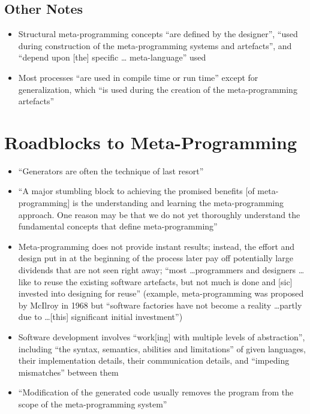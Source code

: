 \subsection{Other Notes}
\begin{itemize}
      \item Structural meta-programming concepts ``are defined by the
            designer'', ``used during construction of the meta-programming
            systems and artefacts'', and ``depend upon [the] specific \dots
            meta-language'' used \citep[p.~24]{stuikys_taxonomy_2013}
      \item Most processes ``are used in compile time or run time'' except for
            generalization, which ``is used during the creation of the
            meta-programming artefacts'' \citep[pp.~24-25]{stuikys_taxonomy_2013}
\end{itemize}

\section{Roadblocks to Meta-Programming}
\label{chap:notes:sec:metaprogramming-roadblocks}
\begin{itemize}
      \item ``Generators are often the technique of last resort''
            \citep[p.~2]{smaragdakis_structured_2017}
      \item ``A major stumbling block to achieving the promised benefits
                  [of meta-programming] is the understanding and learning the
            meta-programming approach. One reason may be that we do not yet
            thoroughly understand the fundamental concepts that define
            meta-programming'' \citep[p.~26]{stuikys_taxonomy_2013}
      \item Meta-programming does not provide instant results; instead, the
            effort and design put in at the beginning of the process later pay
            off potentially large dividends that are not seen right away;
            ``most \dots programmers and designers \dots like to reuse the
            existing software artefacts, but not much is done and [sic]
            invested into designing for reuse'' \citep[p.~26]{stuikys_taxonomy_2013}
            (example, meta-programming was proposed by McIlroy in 1968 but
            ``software factories have not become a reality \dots partly due to
            \dots [this] significant initial investment'')
            \citep[p.~27]{stuikys_taxonomy_2013}
      \item Software development involves ``work[ing] with multiple levels of
            abstraction'', including ``the syntax, semantics, abilities and
            limitations'' of given languages, their implementation details,
            their communication details, and ``impeding mismatches'' between
            them \citep[p.~27]{stuikys_taxonomy_2013}
      \item ``Modification of the generated code usually removes the program
            from the scope of the meta-programming system''
            \citep[p.~27]{stuikys_taxonomy_2013}
\end{itemize}

